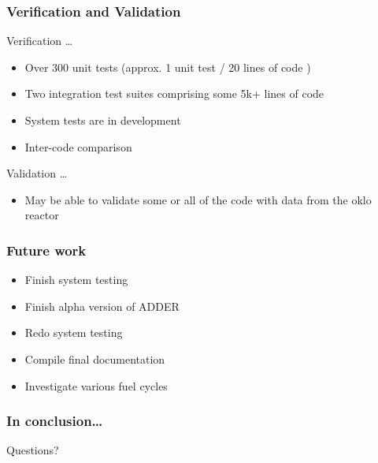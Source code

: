 \documentclass{beamer}
\begin{document}
\begin{frame}
\frametitle{Verification and Validation}

    Verification \ldots

    \hspace{1cm}

    \begin{itemize}
        \item Over 300 unit tests (approx. 1 unit test / 20 lines of code )
        \item Two integration test suites comprising some 5k+ lines of code
        \item System tests are in development
        \item Inter-code comparison
    \end{itemize}

    \hspace{2cm}

    Validation \ldots

    \hspace{1cm}

    \begin{itemize}
        \item May be able to validate some or all of the code with data from
            the oklo reactor
    \end{itemize}

\end{frame}

\begin{frame}
\frametitle{Future work}

    \begin{itemize}

        \item Finish system testing
        \item Finish alpha version of ADDER
        \item Redo system testing
        \item Compile final documentation
        \item Investigate various fuel cycles

    \end{itemize}

\end{frame}

\begin{frame}
\frametitle{In conclusion\ldots}

    Questions?

\end{frame}
\end{document}
